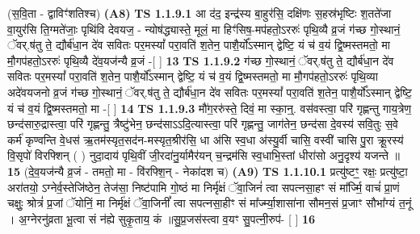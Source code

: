 \documentclass[17pt]{extarticle}
\begin{document}
                  \newline
                      (स॒वि॒ता - द्वाविꣳ॑शतिश्च)  \textbf{(A8)} \newline \newline
                                        \textbf{ TS 1.1.9.1} \newline
                  आ द॑द॒ इन्द्र॑स्य बा॒हुर॑सि॒ दक्षि॑णः स॒हस्र॑भृष्टिः श॒तते॑जा वा॒युर॑सि ति॒ग्मते॑जाः॒ पृथि॑वि देवयज॒ - न्योष॑द्ध्यास्ते॒ मूलं॒ मा हिꣳ॑सिष॒-मप॑हतो॒ऽररुः॑ पृथि॒व्यै व्र॒जं ग॑च्छ गो॒स्थानं॒ ॅवर्.ष॑तु ते॒ द्यौर्ब॑धा॒न दे॑व सवितः पर॒मस्यां᳚ परा॒वति॑ श॒तेन॒ पाशै॒र्यो᳚ऽस्मान् द्वेष्टि॒ यं च॑ व॒यं द्वि॒ष्मस्तमतो॒ मा मौ॒गप॑हतो॒ऽररुः॑ पृथि॒व्यै दे॑व॒यज॑न्यै व्र॒जं -[ ] \textbf{  13} \newline
                  \newline
                                \textbf{ TS 1.1.9.2} \newline
                  ग॑च्छ गो॒स्थानं॒ ॅवर्.ष॑तु ते॒ द्यौर्ब॑धा॒न दे॑व सवितः पर॒मस्यां᳚ परा॒वति॑ श॒तेन॒ पाशै॒र्यो᳚ऽस्मान् द्वेष्टि॒ यं च॑ व॒यं द्वि॒ष्मस्तमतो॒ मा मौ॒गप॑हतो॒ऽररुः॑ पृथि॒व्या अदे॑वयजनो व्र॒जं ग॑च्छ गो॒स्थानं॒ ॅवर्.ष॑तु ते॒ द्यौर्ब॑धा॒न दे॑व सवितः पर॒मस्यां᳚ परा॒वति॑ श॒तेन॒ पाशै॒र्यो᳚ऽस्मान् द्वेष्टि॒ यं च॑ व॒यं द्वि॒ष्मस्तमतो॒ मा -[ ] \textbf{  14} \newline
                  \newline
                                \textbf{ TS 1.1.9.3} \newline
                  मौ॑ग॒ररु॑स्ते॒ दिवं॒ मा स्का॒न्॒. वस॑वस्त्वा॒ परि॑ गृह्णन्तु गाय॒त्रेण॒ छन्द॑सारु॒द्रास्त्वा॒ परि॑ गृह्णन्तु॒ त्रैष्टु॑भेन॒ छन्द॑साऽऽदि॒त्यास्त्वा॒ परि॑ गृह्णन्तु॒ जाग॑तेन॒ छन्द॑सा दे॒वस्य॑ सवि॒तुः स॒वे कर्म॑ कृण्वन्ति वे॒धस॑ ऋ॒तम॑स्यृत॒सद॑न-मस्यृत॒श्रीर॑सि॒ धा अ॑सि स्व॒धा अ॑स्यु॒र्वी चासि॒ वस्वी॑ चासि पु॒रा क्रू॒रस्य॑ वि॒सृपो॑ विरफ्शिन् ( ) नुदा॒दाय॑ पृथि॒वीं जी॒रदा॑नु॒र्यामैर॑यन्  च॒न्द्रम॑सि स्व॒धाभि॒स्तां धीरा॑सो अनु॒दृश्य॑ यजन्ते ॥ \textbf{  15 } \newline
                  \newline
                      (दे॒व॒यज॑न्यै व्र॒जं - तमतो॒ मा - वि॑रफ्शि॒न् - नेका॑दश च)  \textbf{(A9)} \newline \newline
                                        \textbf{ TS 1.1.10.1} \newline
                  प्रत्यु॑ष्टꣳ॒॒ रक्षः॒ प्रत्यु॑ष्टा॒ अरा॑तयो॒ ऽग्नेर्व॒स्तेजि॑ष्ठेन॒ तेज॑सा॒ निष्ट॑पामि गो॒ष्ठं मा निर्मृ॑क्षं ॅवा॒जिनं॑ त्वा सपत्नसा॒हꣳ सं मा᳚र्ज्मि॒ वाचं॑ प्रा॒णं चक्षुः॒ श्रोत्रं॑ प्र॒जां ॅयोनिं॒ मा निर्मृ॑क्षं ॅवा॒जिनीं᳚ त्वा सपत्नसा॒हीꣳ सं मा᳚र्ज्म्या॒शासा॑ना सौमन॒सं प्र॒जाꣳ सौभा᳚ग्यं त॒नूं । अ॒ग्नेरनु॑व्रता भू॒त्वा सं न॑ह्ये सुकृ॒ताय॒ कं ॥सु॒प्र॒जस॑स्त्वा व॒यꣳ सु॒पत्नी॒रुप॑- [ ] \textbf{  16} \newline
\end{document}
